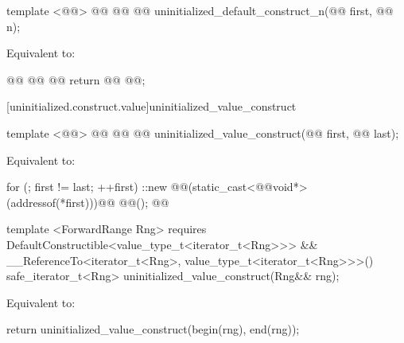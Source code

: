 \begin{codeblock}
  template <@@>
    @@
             @@
  @@
    uninitialized_default_construct_n(@@ first, @@ n);
\end{codeblock}

\pnum
\effects Equivalent to:
\begin{codeblock}
        @@
          @@
            @@
        return @@
                                                               @@;
\end{codeblock}

[uninitialized.construct.value]{uninitialized_value_construct}
\begin{codeblock}
  template <@@>
    @@
             @@
    @@ uninitialized_value_construct(@@ first, @@ last);
\end{codeblock}


\setcounter{Paras}{0}
\effects Equivalent to:
\begin{codeblock}
        for (; first != last; ++first)
          ::new @@(static_cast<@@void*>(addressof(*first)))@\added{)}@
            @@();
        @@
\end{codeblock}
{\color{addclr}
\begin{codeblock}
  template <ForwardRange Rng>
    requires DefaultConstructible<value_type_t<iterator_t<Rng>>> &&
             __ReferenceTo<iterator_t<Rng>, value_type_t<iterator_t<Rng>>>()
  safe_iterator_t<Rng> uninitialized_value_construct(Rng&& rng);
\end{codeblock}

\pnum
\effects Equivalent to:
\begin{codeblock}
      return uninitialized_value_construct(begin(rng), end(rng));
\end{codeblock}
} %

